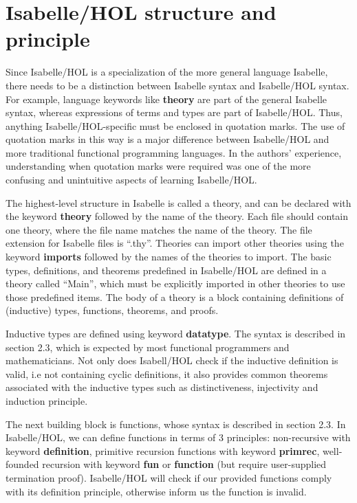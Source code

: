 \documentclass{article}
\begin{document}
\section{Isabelle/HOL structure and principle}

Since Isabelle/HOL is a specialization of the more general language Isabelle,
there needs to be a distinction between Isabelle syntax and Isabelle/HOL
syntax. For example, language keywords like \textbf{theory} are part of the
general Isabelle syntax, whereas expressions of terms and types are part of
Isabelle/HOL. Thus, anything Isabelle/HOL-specific must be enclosed in
quotation marks. The use of quotation marks in this way is a major difference
between Isabelle/HOL and more traditional functional programming languages. In
the authors' experience, understanding when quotation marks were required was
one of the more confusing and unintuitive aspects of learning Isabelle/HOL.

The highest-level structure in Isabelle is called a theory, and can be declared 
with the keyword \textbf{theory} followed by the name of the theory. Each file 
should contain one theory, where the file name matches the name of the theory. 
The file extension for Isabelle files is ``.thy''. Theories can import other 
theories using the keyword \textbf{imports} followed by the names of the 
theories to import. The basic types, definitions, and theorems predefined in 
Isabelle/HOL are defined in a theory called ``Main'', which must be explicitly 
imported in other theories to use those predefined items. The body of a theory 
is a block containing definitions of (inductive) types, functions, theorems, and proofs.

Inductive types are defined using keyword \textbf{datatype}.
The syntax is described in \cite{IsabelleTutorial} section 2.3,
which is expected by most functional programmers and mathematicians.
Not only does Isabell/HOL check if the inductive definition is valid, i.e not containing cyclic definitions,
it also provides common theorems associated with the inductive types such as distinctiveness, injectivity and induction principle.

The next building block is functions, whose syntax is described in \cite{IsabelleTutorial} section 2.3.
In Isabelle/HOL, we can define functions in terms of 3 principles: non-recursive with keyword \textbf{definition}, primitive recursion functions with keyword \textbf{primrec},
well-founded recursion with keyword \textbf{fun} or \textbf{function} (but require user-supplied termination proof).
Isabelle/HOL will check if our provided functions comply with its definition principle, otherwise inform us the function is invalid.
\end{document}

